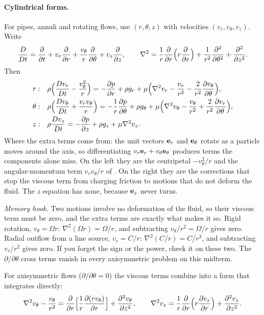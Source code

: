 \paragraph{Cylindrical forms.} For pipes, annuli and rotating flows, use $(r,\theta,z)$ with velocities $(v_r, v_\theta, v_z)$. Write
\[
\frac{D}{Dt} = \frac{\partial }{\partial t} + v_r\frac{\partial }{\partial r} + \frac{v_\theta}{r}\frac{\partial }{\partial \theta} + v_z\frac{\partial }{\partial z}, \qquad
\nabla^2 = \frac{1}{r}\frac{\partial }{\partial r}\Big(r\frac{\partial }{\partial r}\Big) + \frac{1}{r^2}\frac{\partial^2}{\partial\theta^2} + \frac{\partial^2}{\partial z^2} .
\]
Then
\begin{align*}
r:\quad &\rho\Big(\frac{Dv_r}{Dt} - \frac{v_\theta^2}{r}\Big) = -\frac{\partial p}{\partial r} + \rho g_r + \mu\Big(\nabla^2 v_r - \frac{v_r}{r^2} - \frac{2}{r^2}\frac{\partial v_\theta}{\partial \theta}\Big), \\
\theta:\quad &\rho\Big(\frac{Dv_\theta}{Dt} + \frac{v_r v_\theta}{r}\Big) = -\frac{1}{r}\frac{\partial p}{\partial \theta} + \rho g_\theta + \mu\Big(\nabla^2 v_\theta - \frac{v_\theta}{r^2} + \frac{2}{r^2}\frac{\partial v_r}{\partial \theta}\Big), \\
z:\quad &\rho\frac{Dv_z}{Dt} = -\frac{\partial p}{\partial z} + \rho g_z + \mu\nabla^2 v_z .
\end{align*}
Where the extra terms come from: the unit vectors $\mathbf{e}_r$ and $\mathbf{e}_\theta$ rotate as a particle moves around the axis, so differentiating $v_r\mathbf{e}_r + v_\theta\mathbf{e}_\theta$ produces terms the components alone miss. On the left they are the centripetal $-v_\theta^2/r$ and the angular-momentum term $v_r v_\theta/r$ of . On the right they are the corrections that stop the viscous term from charging friction to motions that do not deform the fluid. The $z$ equation has none, because $\mathbf{e}_z$ never turns.

\emph{Memory hook.} Two motions involve no deformation of the fluid, so their viscous term must be zero, and the extra terms are exactly what makes it so. Rigid rotation, $v_\theta = \Omega r$: $\nabla^2(\Omega r) = \Omega/r$, and subtracting $v_\theta/r^2 = \Omega/r$ gives zero. Radial outflow from a line source, $v_r = C/r$: $\nabla^2(C/r) = C/r^3$, and subtracting $v_r/r^2$ gives zero. If you forget the sign or the power, check it on these two. The $\partial/\partial\theta$ cross terms vanish in every axisymmetric problem on this midterm.

For axisymmetric flows ($\partial/\partial\theta = 0$) the viscous terms combine into a form that integrates directly:
\[
\nabla^2 v_\theta - \frac{v_\theta}{r^2} = \frac{\partial }{\partial r}\Big[\frac{1}{r}\frac{\partial (r v_\theta)}{\partial r}\Big] + \frac{\partial^2 v_\theta}{\partial z^2},
\qquad
\nabla^2 v_z = \frac{1}{r}\frac{\partial }{\partial r}\Big(r\frac{\partial v_z}{\partial r}\Big) + \frac{\partial^2 v_z}{\partial z^2}.
\]

